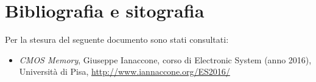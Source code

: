 \documentclass[10 pt,letterpaper,twoside,openright]{book}
\begin{document}
	
	
	
	
	
	
	
	
	\backmatter
	
	
	\chapter{Bibliografia e sitografia}
	\printbibliography[heading=none]
	
	\noindent
	Per la stesura del seguente documento sono stati consultati:
	\begin{itemize}
		\item \textit{CMOS Memory}, Giuseppe Ianaccone, corso di Electronic System (anno 2016), Università di Pisa, \url{http://www.iannaccone.org/ES2016/}
	\end{itemize}
	
	
	
	
		
\end{document}
